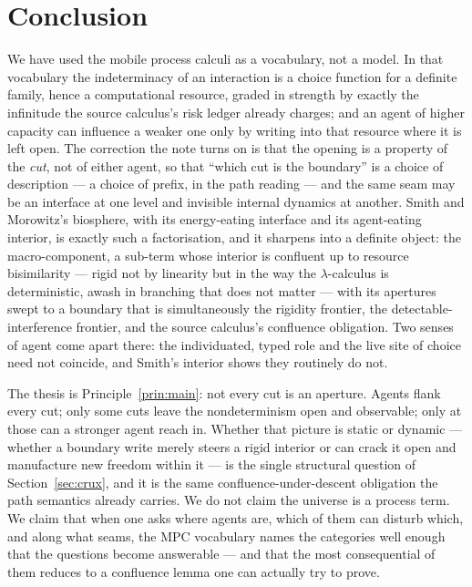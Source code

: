 \documentclass[11pt]{article}
\theoremstyle{definition}
\theoremstyle{plain}
\theoremstyle{remark}
\begin{document}
\section{Conclusion}

We have used the mobile process calculi as a vocabulary, not a model. In that
vocabulary the indeterminacy of an interaction is a choice function for a definite
family, hence a computational resource, graded in strength by exactly the
infinitude the source calculus's risk ledger already charges; and an agent of
higher capacity can influence a weaker one only by writing into that resource where
it is left open. The correction the note turns on is that the opening is a property
of the \emph{cut}, not of either agent, so that ``which cut is the boundary'' is a
choice of description --- a choice of prefix, in the path reading --- and the same
seam may be an interface at one level and invisible internal dynamics at another.
Smith and Morowitz's biosphere, with its energy-eating interface and its
agent-eating interior, is exactly such a factorisation, and it sharpens into a
definite object: the macro-component, a sub-term whose interior is confluent up to
resource bisimilarity --- rigid not by linearity but in the way the
$\lambda$-calculus is deterministic, awash in branching that does not matter --- with
its apertures swept to a boundary that is simultaneously the rigidity frontier, the
detectable-interference frontier, and the source calculus's confluence obligation.
Two senses of agent come apart there: the individuated, typed role and the live
site of choice need not coincide, and Smith's interior shows they routinely do not.

The thesis is Principle~\ref{prin:main}: not every cut is an aperture. Agents flank
every cut; only some cuts leave the nondeterminism open and observable; only at
those can a stronger agent reach in. Whether that picture is static or dynamic ---
whether a boundary write merely steers a rigid interior or can crack it open and
manufacture new freedom within it --- is the single structural question of
Section~\ref{sec:crux}, and it is the same confluence-under-descent obligation the
path semantics already carries. We do not claim the universe is a process term. We
claim that when one asks where agents are, which of them can disturb which, and
along what seams, the MPC vocabulary names the categories well enough that the
questions become answerable --- and that the most consequential of them reduces to
a confluence lemma one can actually try to prove.
\end{document}
